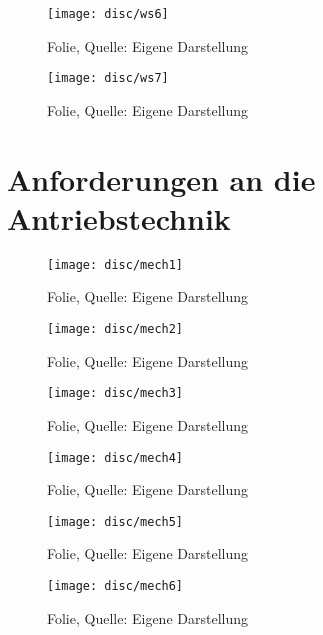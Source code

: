 \begin{figure}[H]
    \centering
    \texttt{[image: disc/ws6]}
    \caption[Folie]{Folie, Quelle: Eigene Darstellung}
    \label{fig:ws6}
\end{figure}

\begin{figure}[H]
    \centering
    \texttt{[image: disc/ws7]}
    \caption[Folie]{Folie, Quelle: Eigene Darstellung}
    \label{fig:ws7}
\end{figure}

\thispagestyle{scrheadings}
\section{Anforderungen an die Antriebstechnik}
\label{disc-mess}

\begin{figure}[H]
    \centering
    \texttt{[image: disc/mech1]}
    \caption[Folie]{Folie, Quelle: Eigene Darstellung}
    \label{fig:mech1}
\end{figure}

\begin{figure}[H]
    \centering
    \texttt{[image: disc/mech2]}
    \caption[Folie]{Folie, Quelle: Eigene Darstellung}
    \label{fig:mech2}
\end{figure}

\begin{figure}[H]
    \centering
    \texttt{[image: disc/mech3]}
    \caption[Folie]{Folie, Quelle: Eigene Darstellung}
    \label{fig:mech3}
\end{figure}

\begin{figure}[H]
    \centering
    \texttt{[image: disc/mech4]}
    \caption[Folie]{Folie, Quelle: Eigene Darstellung}
    \label{fig:mech4}
\end{figure}

\begin{figure}[H]
    \centering
    \texttt{[image: disc/mech5]}
    \caption[Folie]{Folie, Quelle: Eigene Darstellung}
    \label{fig:mech5}
\end{figure}

\begin{figure}[H]
    \centering
    \texttt{[image: disc/mech6]}
    \caption[Folie]{Folie, Quelle: Eigene Darstellung}
    \label{fig:mech6}
\end{figure}

